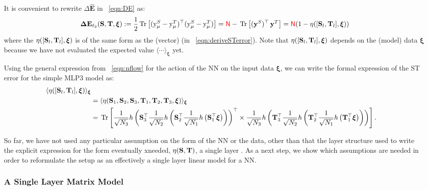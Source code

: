 It is convenient to rewrite $\Delta \mathbf{\hat{E}}$ in \EQN~\ref{eqn:DE} as:
\begin{align}
\label{eqn:DE2}
\mathbf{\Delta {E}}_{\ell_2}({\mathbf{S}},{\mathbf{T}}, \boldsymbol{\xi})
   := \frac{1}{2} \mbox{}\operatorname{Tr}\left[ (\mathrm{y}_{\mu}^{S} - \mathrm{y}_{\mu}^{T})^\top (\mathrm{y}_{\mu}^{S} - \mathrm{y}_{\mu}^{T}) \right]
   = {\color{red}\sf{N}} - \mbox{}\operatorname{Tr}\left[ (\mathbf{y}^{S})^{\top} \, \mathbf{y}^{T}  \right]
   = {\color{red}\sf{N}}(1 - \eta([{\mathbf{S}}_l,{\mathbf{T}}_l],\boldsymbol{\xi}))
\end{align}
where the \SelfOverlap $\eta([{\mathbf{S}}_l,{\mathbf{T}}_l],\boldsymbol{\xi})$
is of the same form as the (vector) \LinearPerceptron (in \EQN~\ref{eqn:deriveSTerror}).
Note that $\eta([{\mathbf{S}}_l,{\mathbf{T}}_l],\boldsymbol{\xi})$ depends on the (model) data $\boldsymbol{\xi}$
because we have not evaluated the expected value $\langle \cdots \rangle_{\boldsymbol{\xi}}$ yet.

Using the general expression from \EQN~\ref{eqn:nflow} for the action of the NN on the input data $\boldsymbol{\xi}$,
we can write the formal expression of the ST error for the simple MLP3 model as:
\begin{align}
\label{eqn:overlap1}
\langle\eta([{\mathbf{S}}_l,{\mathbf{T}}_l],\boldsymbol{\xi})\rangle_{\boldsymbol{\xi}}  \\ \nonumber
& =\langle\eta({\mathbf{S}}_1,{\mathbf{S}}_2,{\mathbf{S}}_3,{\mathbf{T}}_1,{\mathbf{T}}_2,{\mathbf{T}}_3,\boldsymbol{\xi})\rangle_{\boldsymbol{\xi}}  \\ \nonumber
& =  \mbox{}\operatorname{Tr}\left[
    \frac{1}{\sqrt{N_3}} h\left(\mathbf{S}_3^{\top} 
    \frac{1}{\sqrt{N_2}} h\left(\mathbf{S}_2^{\top} 
    \frac{1}{\sqrt{N_1}} h\left(\mathbf{S}_1^{\top} \boldsymbol{\xi} \right)\right)\right)^{\top} 
    \times
    \frac{1}{\sqrt{N_3}} h\left(\mathbf{T}_3^{\top} 
    \frac{1}{\sqrt{N_2}} h\left(\mathbf{T}_2^{\top} 
    \frac{1}{\sqrt{N_1}} h\left(\mathbf{T}_1^{\top} \boldsymbol{\xi} \right)\right)\right)
  \right].
\end{align}

So far, we have not used any particular assumption on the form of the NN or the data, 
other than that the layer structure used to write the explicit expression for the form eventually xneeded,
$\eta({\mathbf{S}},{\mathbf{T}})$, a single layer \SelfOverlap.
As a next step, we show which assumptions are needed in order to reformulate the setup as
an effectively a single layer linear model for a NN.


\subsubsection{A Single Layer Matrix Model}

